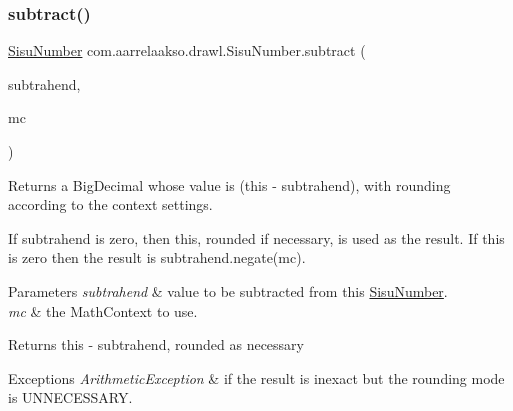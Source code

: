 \subsubsection{\texorpdfstring{subtract()}{subtract()}\hspace{0.1cm}{\footnotesize\ttfamily [2/3]}}
{\footnotesize\ttfamily \hyperlink{classcom_1_1aarrelaakso_1_1drawl_1_1_sisu_number}{Sisu\+Number} com.\+aarrelaakso.\+drawl.\+Sisu\+Number.\+subtract (\begin{DoxyParamCaption}\item[{@Not\+Null final \hyperlink{classcom_1_1aarrelaakso_1_1drawl_1_1_sisu_number}{Sisu\+Number}}]{subtrahend,  }\item[{final Math\+Context}]{mc }\end{DoxyParamCaption})\hspace{0.3cm}{\ttfamily [protected]}}



Returns a Big\+Decimal whose value is (this -\/ subtrahend), with rounding according to the context settings. 

If subtrahend is zero, then this, rounded if necessary, is used as the result. If this is zero then the result is subtrahend.\+negate(mc).


\begin{DoxyParams}{Parameters}
{\em subtrahend} & value to be subtracted from this \hyperlink{classcom_1_1aarrelaakso_1_1drawl_1_1_sisu_number}{Sisu\+Number}. \\
\hline
{\em mc} & the Math\+Context to use. \\
\hline
\end{DoxyParams}
\begin{DoxyReturn}{Returns}
this -\/ subtrahend, rounded as necessary 
\end{DoxyReturn}

\begin{DoxyExceptions}{Exceptions}
{\em Arithmetic\+Exception} & if the result is inexact but the rounding mode is U\+N\+N\+E\+C\+E\+S\+S\+A\+RY. \\
\hline
\end{DoxyExceptions}
\mbox{\label{classcom_1_1aarrelaakso_1_1drawl_1_1_sisu_number_ab152fb0010ff0cee6a4f94a157c58a02}} 
